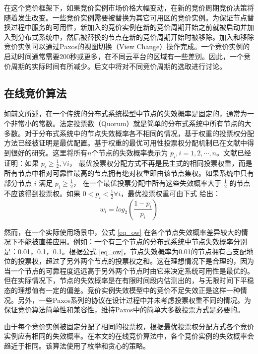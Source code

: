 在这个竞价框架下，如果竞价实例市场价格大幅变动，在新的竞价周期竞价决策将随着发生改变。一些竞价实例需要被替换为其它可用区的竞价实例。为保证节点替换过程中服务的可用性，新加入的竞价实例在新的竞价周期开始之前就被启动并加入到分布式系统中，然后被替换的节点在新的竞价周期开始时被移除。加入和移除竞价实例可以通过Paxos的视图切换（View Change）操作完成。一个竞价实例的启动时间通常需要200秒或更多，在不同云平台的区域有一些差别\cite{Mao:2012:PSV:2353730.2353859}。因此，一个竞价周期的实际时间有所减少。后文中将对不同竞价周期的选取进行讨论。

\subsection{在线竞价算法}
\label{subsec:jupiter-bidding}
如前文所述，在一个传统的分布式系统模型中节点的失效概率是固定的，通常为一个非常小的常数。法定投票数（Quorum）就是简单的分布式系统中所有节点的大多数。对于分布式系统中的节点失效概率各不相同的情况，基于权重的投票权分配方法已经被证明是最优配置。基于权重的最优可用性投票权分配机制已在文献\cite{25789, 262589, Amir1998223}中得到很好的研究。这里将所有$n$个节点的失效概率表示为 $p_i, i = 1, 2, \cdots, n$。文献\cite{Amir1998223}已经证明：如果 $p_i \geq \frac{1}{2}, \forall i$， 最优投票权分配方式不再是民主式的相同投票权重，而是所有节点中相对可靠性最高的节点拥有绝对权重即由该节点集权。如果系统中只有部分节点 $i$ 满足 $p_i \geq \frac{1}{2}$， 在一个最优投票分配中所有这些失效概率大于 $\frac{1}{2}$ 的节点不应该得到投票权。如果 $0 < p_i < \frac{1}{2} \forall i$，最优投票权重可由下式 \cite{262589, 25789}给出：
\begin{equation}\label{eq_ow}
w_i = log_2(\frac{1-p_i}{p_i})
\end{equation}

然而，在一个实际使用场景中，公式 \eqref{eq_ow} 在各个节点失效概率差异较大的情况下不能被直接应用。例如：一个有三个节点的分布式系统中节点失效概率分别是：0.01，0.1，0.1。根据公式 \eqref{eq_ow}，节点失效概率为0.01的节点拥有占支配地位的投票权，超过了另外两个节点的投票权之和。这在理想情况下是合理的，因为当一个节点的可靠程度远远高于另外两个节点时由它来决定系统可用性是最优的。但在实际情况下，节点的失效概率是在有限时间段内估测出的，与无限时间下平稳态的理想值有一定的偏差。竞价实例失效模型中的竞价不足失效正是这样一种情况。另外，一些Paxos系列的协议在设计过程中并未考虑投票权重不同的情况。为保证竞价算法简单性和兼容性，维持Paxos中的简单大多数投票方式是必要的。

由于每个竞价实例被固定分配了相同的投票权，根据最优投票权分配方式各个竞价实例应有相同的失效概率。在本文的在线竞价算法中，各个竞价实例的失效概率会趋近于相同。该算法使用了枚举和贪心的策略。

